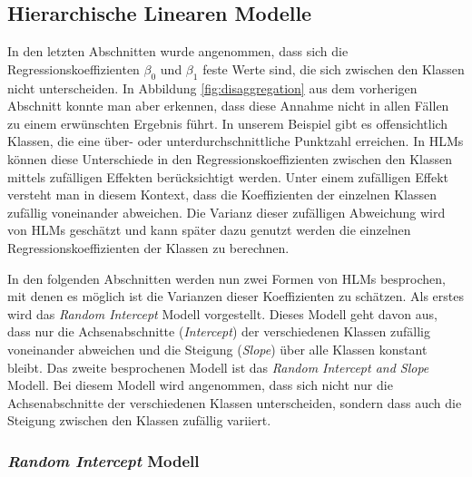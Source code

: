 \documentclass[12pt]{article}\usepackage[]{graphicx}\usepackage[]{color}
\begin{document}
\subsection{Hierarchische Linearen Modelle}
In den letzten Abschnitten wurde angenommen, dass sich die Regressionskoeffizienten $\beta_0$ und $\beta_1$ feste Werte sind, die sich zwischen den Klassen nicht unterscheiden. In Abbildung \ref{fig:disaggregation} aus dem vorherigen Abschnitt konnte man aber erkennen, dass diese Annahme nicht in allen Fällen zu einem erwünschten Ergebnis führt. In unserem Beispiel gibt es offensichtlich Klassen, die eine über- oder unterdurchschnittliche Punktzahl erreichen. In HLMs können diese Unterschiede in den Regressionskoeffizienten zwischen den Klassen mittels zufälligen Effekten berücksichtigt werden. Unter einem zufälligen Effekt versteht man in diesem Kontext, dass die Koeffizienten der einzelnen Klassen zufällig voneinander abweichen. Die Varianz dieser zufälligen Abweichung wird von HLMs geschätzt und kann später dazu genutzt werden die einzelnen Regressionskoeffizienten der Klassen zu berechnen.

In den folgenden Abschnitten werden nun zwei Formen von HLMs besprochen, mit denen es möglich ist die Varianzen dieser Koeffizienten zu schätzen. Als erstes wird das \textit{Random Intercept} Modell vorgestellt. Dieses Modell geht davon aus, dass nur die Achsenabschnitte (\textit{Intercept}) der verschiedenen Klassen zufällig voneinander abweichen und die Steigung (\textit{Slope}) über alle Klassen konstant bleibt. Das zweite besprochenen Modell ist das \textit{Random Intercept and Slope} Modell. Bei diesem Modell wird angenommen, dass sich nicht nur die Achsenabschnitte der verschiedenen Klassen unterscheiden, sondern dass auch die Steigung zwischen den Klassen zufällig variiert.

\subsubsection{\textit{Random Intercept} Modell} \label{section:random_intercept_model}
\end{document}
